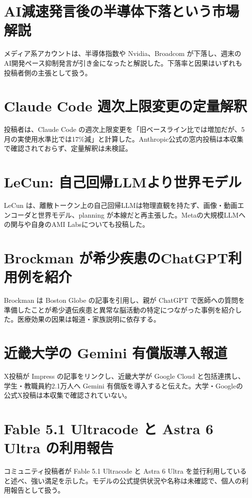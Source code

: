 \section{AI減速発言後の半導体下落という市場解説}
メディア系アカウントは、半導体指数や Nvidia、Broadcom が下落し、週末のAI開発ペース抑制発言が引き金になったと解説した。下落率と因果はいずれも投稿者側の主張として扱う。

\section{Claude Code 週次上限変更の定量解釈}
投稿者は、Claude Code の週次上限変更を「旧ベースライン比では増加だが、5月の実使用水準比では17\%減」と計算した。Anthropic公式の窓内投稿は本収集で確認されておらず、定量解釈は未検証。

\section{LeCun: 自己回帰LLMより世界モデル}
LeCun は、離散トークン上の自己回帰LLMは物理直観を持たず、画像・動画エンコーダと世界モデル、planning が本線だと再主張した。Metaの大規模LLMへの関与や自身のAMI Labsについても投稿した。

\section{Brockman が希少疾患のChatGPT利用例を紹介}
Brockman は Boston Globe の記事を引用し、親が ChatGPT で医師への質問を準備したことが希少遺伝疾患と異常な脳活動の特定につながった事例を紹介した。医療効果の因果は報道・家族説明に依存する。

\section{近畿大学の Gemini 有償版導入報道}
X投稿が Impress の記事をリンクし、近畿大学が Google Cloud と包括連携し、学生・教職員約2.1万人へ Gemini 有償版を導入すると伝えた。大学・Googleの公式X投稿は本収集で確認されていない。

\section{Fable 5.1 Ultracode と Astra 6 Ultra の利用報告}
コミュニティ投稿者が Fable 5.1 Ultracode と Astra 6 Ultra を並行利用していると述べ、強い満足を示した。モデルの公式提供状況や名称は未確認で、個人の利用報告として扱う。

